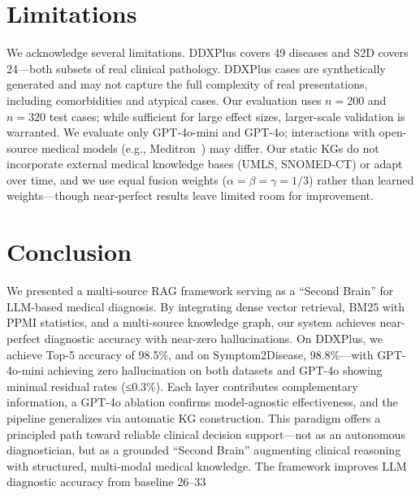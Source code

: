 \documentclass[preprint,12pt]{elsarticle}
\begin{document}
\section{Limitations}
\label{sec:limitations}

We acknowledge several limitations. DDXPlus covers 49 diseases and S2D covers 24---both subsets of real clinical pathology. DDXPlus cases are synthetically generated and may not capture the full complexity of real presentations, including comorbidities and atypical cases. Our evaluation uses $n{=}200$ and $n{=}320$ test cases; while sufficient for large effect sizes, larger-scale validation is warranted. We evaluate only GPT-4o-mini and GPT-4o; interactions with open-source medical models (e.g., Meditron~\cite{chen2023meditron}) may differ. Our static KGs do not incorporate external medical knowledge bases (UMLS, SNOMED-CT) or adapt over time, and we use equal fusion weights ($\alpha{=}\beta{=}\gamma{=}1/3$) rather than learned weights---though near-perfect results leave limited room for improvement.

\section{Conclusion}
\label{sec:conclusion}

We presented a multi-source RAG framework serving as a ``Second Brain'' for LLM-based medical diagnosis. By integrating dense vector retrieval, BM25 with PPMI statistics, and a multi-source knowledge graph, our system achieves near-perfect diagnostic accuracy with near-zero hallucinations. On DDXPlus, we achieve Top-5 accuracy of 98.5\%, and on Symptom2Disease, 98.8\%---with GPT-4o-mini achieving zero hallucination on both datasets and GPT-4o showing minimal residual rates (≤0.3\%). Each layer contributes complementary information, a GPT-4o ablation confirms model-agnostic effectiveness, and the pipeline generalizes via automatic KG construction. This paradigm offers a principled path toward reliable clinical decision support---not as an autonomous diagnostician, but as a grounded ``Second Brain'' augmenting clinical reasoning with structured, multi-modal medical knowledge. The framework improves LLM diagnostic accuracy from baseline 26–33%

\end{document}
